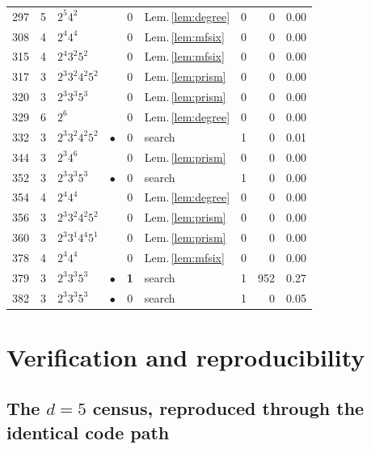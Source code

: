 \documentclass[11pt,reqno]{amsart}
\theoremstyle{plain}
\theoremstyle{definition}
\begin{document}
{\begin{longtable}{r r l c c l r r r}
297 & 5 & $2^{5}4^{2}$ &  & 0 & Lem.\,\ref{lem:degree} & 0 & 0 & 0.00 \\
308 & 4 & $2^{4}4^{4}$ &  & 0 & Lem.\,\ref{lem:mfsix} & 0 & 0 & 0.00 \\
315 & 4 & $2^{4}3^{2}5^{2}$ &  & 0 & Lem.\,\ref{lem:mfsix} & 0 & 0 & 0.00 \\
317 & 3 & $2^{3}3^{2}4^{2}5^{2}$ &  & 0 & Lem.\,\ref{lem:prism} & 0 & 0 & 0.00 \\
320 & 3 & $2^{3}3^{3}5^{3}$ &  & 0 & Lem.\,\ref{lem:prism} & 0 & 0 & 0.00 \\
329 & 6 & $2^{6}$ &  & 0 & Lem.\,\ref{lem:degree} & 0 & 0 & 0.00 \\
332 & 3 & $2^{3}3^{2}4^{2}5^{2}$ & $\bullet$ & 0 & search & 1 & 0 & 0.01 \\
344 & 3 & $2^{3}4^{6}$ &  & 0 & Lem.\,\ref{lem:prism} & 0 & 0 & 0.00 \\
352 & 3 & $2^{3}3^{3}5^{3}$ & $\bullet$ & 0 & search & 1 & 0 & 0.00 \\
354 & 4 & $2^{4}4^{4}$ &  & 0 & Lem.\,\ref{lem:degree} & 0 & 0 & 0.00 \\
356 & 3 & $2^{3}3^{2}4^{2}5^{2}$ &  & 0 & Lem.\,\ref{lem:prism} & 0 & 0 & 0.00 \\
360 & 3 & $2^{3}3^{1}4^{4}5^{1}$ &  & 0 & Lem.\,\ref{lem:prism} & 0 & 0 & 0.00 \\
378 & 4 & $2^{4}4^{4}$ &  & 0 & Lem.\,\ref{lem:mfsix} & 0 & 0 & 0.00 \\
379 & 3 & $2^{3}3^{3}5^{3}$ & $\bullet$ & \textbf{1} & search & 1 & 952 & 0.27 \\
382 & 3 & $2^{3}3^{3}5^{3}$ & $\bullet$ & 0 & search & 1 & 0 & 0.05 \\

\end{longtable}
}

\section{Verification and reproducibility}
\label{sec:verification}

\subsection{The $d=5$ census, reproduced through the identical code path}
\label{sec:d5valid}
\end{document}
